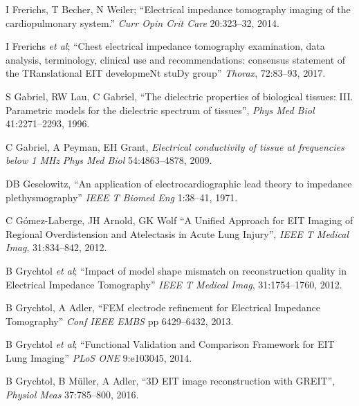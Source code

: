 \documentclass[10pt,journal]{IEEEtran}\def\TBLWIDA{15mm}\def\TBLWIDB{60mm}
\newcommand{\ifmaxthree}[2]{#2 {\em et al}; }
\begin{document}
\begin{thebibliography}{00}
I Frerichs, T Becher, N Weiler; 
``Electrical impedance tomography imaging of the cardiopulmonary system.''
{\em Curr Opin Crit Care} 20:323--32, 2014.

\ifmaxthree{
I Frerichs, M Amato, A Van Kaam, D Tingay, Z Zhao, B Grychtol, M Bodenstein,
H; Gagnon, S Böhm, E Teschner, O Stenqvist, T Mauri, V Torsani, C Luigi,
A Schibler, G Wolf, D Gommers, S Leonhardt, A Adler
}{
I Frerichs
}
``Chest electrical impedance tomography
examination, data analysis, terminology, clinical use and recommendations:
consensus statement of the TRanslational EIT developmeNt stuDy group''
{\em Thorax}, 72:83--93, 2017.


S Gabriel, RW Lau, C Gabriel,
``The dielectric properties of biological tissues: III. Parametric models for the dielectric spectrum of tissues'',
{\em  Phys Med Biol} 41:2271--2293, 1996.

C Gabriel, A Peyman, EH Grant,
{\em Electrical conductivity of tissue at frequencies below 1 MHz}
{\em Phys Med Biol} 54:4863--4878, 2009.

DB Geselowitz, 
``An application of electrocardiographic lead theory to impedance
plethysmography''
{\em  IEEE T Biomed Eng} 1:38--41, 1971.

C Gómez-Laberge, JH Arnold, GK Wolf
``A Unified Approach for EIT Imaging of Regional Overdistension and Atelectasis
in Acute Lung Injury'',
{\em IEEE T Medical Imag}, 31:834--842, 2012.

\ifmaxthree{
B Grychtol, WRB Lionheart, M Bodenstein, GK Wolf, A Adler
}{
B Grychtol
}
``Impact of model shape mismatch on reconstruction quality in Electrical Impedance Tomography''
{\em IEEE T Medical Imag}, 31:1754--1760, 2012.

B Grychtol, A Adler,
``FEM electrode refinement for Electrical Impedance Tomography''
{\em Conf IEEE EMBS} pp 6429--6432, 2013. %

\ifmaxthree{
B Grychtol, G Elke, P Meybohm, N Weiler, I Frerichs, A Adler,
}{
B Grychtol
}
``Functional Validation and Comparison Framework for EIT Lung Imaging''
{\em PLoS ONE} 9:e103045, 2014.

B Grychtol, B Müller, A Adler,
``3D EIT image reconstruction with GREIT'',
{\em Physiol Meas} 37:785--800, 2016.


\end{thebibliography}
\end{document}
